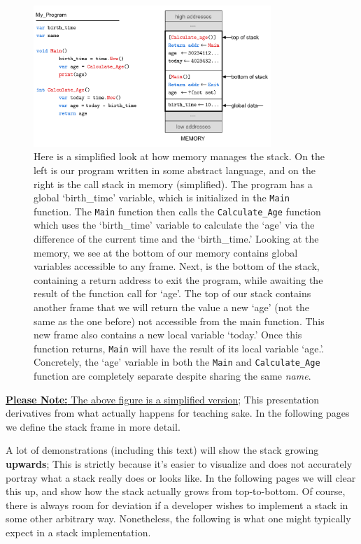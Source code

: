 \begin{figure}[ht!]
    \centering
    \includegraphics[width=0.8\textwidth]{./Sections/stacks_heaps/call_stack.png}
    \caption{Here is a simplified look at how memory manages the stack. On the left is our program written 
    in some abstract language, and on the right is the call stack in memory (simplified). 
    The program has a global `birth\_time' variable, which is initialized in the \texttt{Main} function. The \texttt{Main} function
    then calls the \texttt{Calculate\_Age} function which uses the `birth\_time' variable to calculate the `age' via the difference of 
    the current time and the `birth\_time.'
    Looking at the memory, we see at the bottom of our memory contains global variables accessible to any frame. Next, is the bottom of the stack, containing a return address to exit 
    the program, while awaiting the result of the function call for `age'. The top of our stack contains another frame that we will return the value
    a new `age' (not the same as the one before) not accessible from the main function. This new frame also contains a new local variable `today.'
    Once this function returns, \texttt{Main} will have the result of its local variable `age.'. Concretely, the 
    `age' variable in both the \texttt{Main} and \texttt{Calculate\_Age} function are completely separate despite sharing the same \textit{name}.}
    \label{fig:call_stack}
\end{figure}

\newpage 

\noindent
\underline{\textbf{Please Note:} The above figure is a simplified version}; This presentation derivatives from what actually happens
for teaching sake. In the following pages we define the stack frame in more detail.

\begin{Tip}
A lot of demonstrations (including this text) will show the stack growing \textbf{upwards}; This is strictly because it's easier to visualize and does not
accurately portray what a stack really does or looks like. In the following pages we will clear this up, and show how the stack actually grows from top-to-bottom.
Of course, there is always room for deviation if a developer wishes to implement a stack in some other arbitrary way. Nonetheless, the following is what one 
might typically expect in a stack implementation.
\end{Tip}

